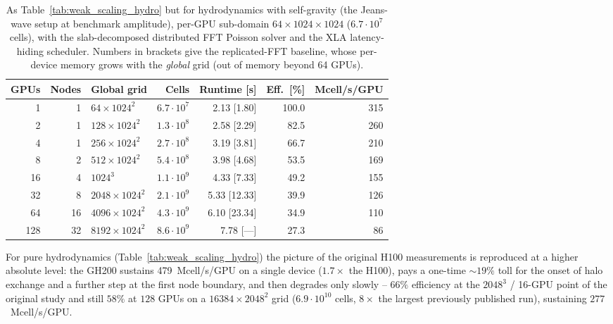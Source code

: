 \begin{table}
    \centering
    \caption{As Table~\ref{tab:weak_scaling_hydro} but for hydrodynamics
    with self-gravity (the Jeans-wave setup at benchmark amplitude),
    per-GPU sub-domain $64\times1024\times1024$ ($6.7\cdot10^{7}$ cells),
    with the slab-decomposed distributed FFT Poisson solver and the XLA
    latency-hiding scheduler.  Numbers in brackets give the replicated-FFT
    baseline, whose per-device memory grows with the \emph{global} grid
    (out of memory beyond 64 GPUs).}
    \label{tab:weak_scaling_selfgrav}
    \begin{tabular}{rrlrrrr}
        \toprule
        GPUs & Nodes & Global grid & Cells & Runtime [s] & Eff.\ [\%] & Mcell/s/GPU \\
        \midrule
        1 & 1 & $64\times1024^{2}$ & $6.7\cdot10^{7}$ & 2.13 [1.80] & 100.0 & 315 \\
        2 & 1 & $128\times1024^{2}$ & $1.3\cdot10^{8}$ & 2.58 [2.29] & 82.5 & 260 \\
        4 & 1 & $256\times1024^{2}$ & $2.7\cdot10^{8}$ & 3.19 [3.81] & 66.7 & 210 \\
        8 & 2 & $512\times1024^{2}$ & $5.4\cdot10^{8}$ & 3.98 [4.68] & 53.5 & 169 \\
        16 & 4 & $1024^{3}$ & $1.1\cdot10^{9}$ & 4.33 [7.33] & 49.2 & 155 \\
        32 & 8 & $2048\times1024^{2}$ & $2.1\cdot10^{9}$ & 5.33 [12.33] & 39.9 & 126 \\
        64 & 16 & $4096\times1024^{2}$ & $4.3\cdot10^{9}$ & 6.10 [23.34] & 34.9 & 110 \\
        128 & 32 & $8192\times1024^{2}$ & $8.6\cdot10^{9}$ & 7.78 [---] & 27.3 & 86 \\
        \bottomrule
    \end{tabular}
\end{table}

For pure hydrodynamics (Table~\ref{tab:weak_scaling_hydro}) the picture of
the original H100 measurements is reproduced at a higher absolute level:
the GH200 sustains 479~Mcell/s/GPU on a single device ($1.7\times$ the
H100), pays a one-time $\sim\!19\%$ toll for the onset of halo exchange
and a further step at the first node boundary, and then degrades only
slowly -- $66\%$ efficiency at the $2048^{3}$ / 16-GPU point of the
original study and still $58\%$ at $128$ GPUs on a
$16384\times2048^{2}$ grid ($6.9\cdot10^{10}$ cells, $8\times$ the largest
previously published run), sustaining $277$~Mcell/s/GPU.

